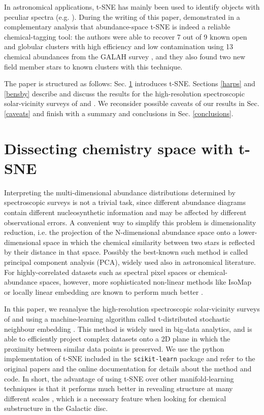 \documentclass{aa}  %
\begin{document}
In astronomical applications, t-SNE has mainly been used to identify objects with peculiar spectra (e.g. \citealt{Matijevivc2017, Valentini2017, Traven2017}). 
During the writing of this paper, \citet{Kos2017} demonstrated in a complementary analysis that abundance-space t-SNE is indeed a reliable chemical-tagging tool: the authors were able to recover 7 out of 9 known open and globular clusters with high efficiency and low contamination using 13 chemical abundances from the GALAH survey \citep{Martell2017}, and they also found two new field member stars to known clusters with this technique. 

The paper is structured as follows: Sec. \ref{method} introduces t-SNE. Sections \ref{harps} and \ref{bensby} describe and discuss the results for the high-resolution spectroscopic solar-vicinity surveys of \citet{DelgadoMena2017} and \citet{Bensby2014}. We reconsider possible caveats of our results in Sec. \ref{caveats} and finish with a summary and conclusions in Sec. \ref{conclusions}.

\section{Dissecting chemistry space with t-SNE}\label{method}

Interpreting the multi-dimensional abundance distributions determined by spectroscopic surveys is not a trivial task, since different abundance diagrams contain different nucleosynthetic information and may be affected by different observational errors. A convenient way to simplify this problem is dimensionality reduction, i.e. the projection of the N-dimensional abundance space onto a lower-dimensional space in which the chemical similarity between two stars is reflected by their distance in that space. Possibly the best-known such method is called principal component analysis (PCA), widely used also in astronomical literature. For highly-correlated datasets such as spectral pixel spaces or chemical-abundance spaces, however, more sophisticated non-linear methods like IsoMap or locally linear embedding are known to perform much better \citep[e.g.][]{Matijevivc2012, Ivezic2013}.

In this paper, we reanalyse the high-resolution spectroscopic solar-vicinity surveys of \citet{Bensby2014} and \citet{DelgadoMena2017} using a machine-learning algorithm called t-distributed stochastic neighbour embedding \citep[t-SNE;][]{Hinton2003, vanderMaaten2008}. This method is widely used in big-data analytics, and is able to efficiently project complex datasets onto a 2D plane in which the proximity between similar data points is preserved. We use the python implementation of t-SNE included in the {\tt scikit-learn} package \citep{Pedregosa2012} and refer to the original papers and the online documentation for details about the method and code. In short, the advantage of using t-SNE over other manifold-learning techniques is that it performs much better in revealing structure at many different scales \citep{vanderMaaten2008, Matijevivc2017}, which is a necessary feature when looking for chemical substructure in the Galactic disc.
\end{document}
